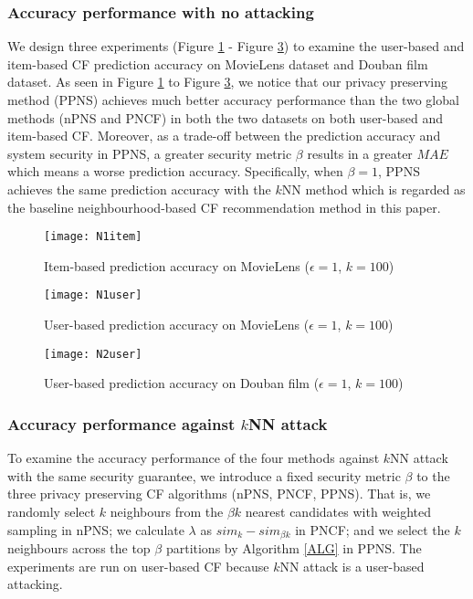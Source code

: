 \documentclass[11pt]{article}
\begin{document}
\subsubsection{Accuracy performance with no attacking}
We design three experiments (Figure \ref{fig:N1item} - Figure \ref{fig:N2user}) to examine the user-based and item-based CF prediction accuracy on MovieLens dataset and Douban film dataset. As seen in Figure \ref{fig:N1item} to Figure \ref{fig:N2user}, we notice that our privacy preserving method (PPNS) achieves much better accuracy performance than the two global methods (nPNS and PNCF) in both the two datasets on both user-based and item-based CF. Moreover, as a trade-off between the prediction accuracy and system security in PPNS, a greater security metric $\beta$ results in a greater $MAE$ which means a worse prediction accuracy. Specifically, when $\beta=1$, PPNS achieves the same prediction accuracy with the $k$NN method which is regarded as the baseline neighbourhood-based CF recommendation method in this paper.
\begin{figure}[!h]
\centering
\texttt{[image: N1item]}
\caption{Item-based prediction accuracy on MovieLens ($\epsilon=1$, $k=100$)}
\label{fig:N1item}
\end{figure}
\begin{figure}[!h]
\centering
\texttt{[image: N1user]}
\caption{User-based prediction accuracy on MovieLens ($\epsilon=1$, $k=100$)}
\label{fig:N1user}
\end{figure}
\begin{figure}[!h]
\centering
\texttt{[image: N2user]}
\caption{User-based prediction accuracy on Douban film ($\epsilon=1$, $k=100$)}
\label{fig:N2user}
\end{figure}


\subsubsection{Accuracy performance against $k$NN attack}
To examine the accuracy performance of the four methods against $k$NN attack with the same security guarantee, we introduce a fixed security metric $\beta$ to the three privacy preserving CF algorithms (nPNS, PNCF, PPNS). That is, we randomly select $k$ neighbours from the $\beta k$ nearest candidates with weighted sampling in nPNS; we calculate $\lambda$ as $sim_k-sim_{\beta k}$ in PNCF; and we select the $k$ neighbours across the top $\beta$ partitions by Algorithm \ref{ALG} in PPNS. The experiments are run on user-based CF because $k$NN attack is a user-based attacking.
\end{document}
